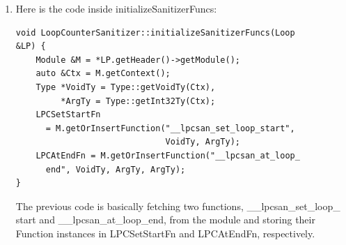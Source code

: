 \begin{enumerate}
\begin{lstlisting}[style=styleCXX]
void foo(int S, int E, int ST) {
	for (int i = S; i < E; i += ST) {
		…
	}
}
\end{lstlisting}

In the preceding code, the S, E, and ST variables represent the initial, final, and step values of a loop, respectively. The goal of the  LoopCounterSanitizer pass is to insert LPCSetStartFn and LPCAtEndFn in the following way:

\begin{lstlisting}[style=styleCXX]
void foo(int S, int E, int ST) {
	for (int i = S; i < E; i += ST) {
		lpc_set_start(S);
		…
		lpc_at_end(E, ST);
	}
}
\end{lstlisting}

lpc\_set\_start and lpc\_at\_end in the preceding code are Function instances that are stored in LPCSetStartFn and LPCAtEndFn, respectively. Here is one of the possible (pseudo) implementations of these two functions:

\begin{lstlisting}[style=styleCXX]
static int CurrentStartVal = 0;
void lpc_set_start(int start) {
	CurrentStartVal = start;
}
void lpc_at_end(int end, int step) {
	int trip_count = (end – CurrentStartVal) / step;
	printf("Found a loop with trip count %d\n",
	trip_count);
}
\end{lstlisting}

Now that we know the roles of LPCSetStartFn and LPCAtEndFn, it's time to take a look at how initializeSanitizerFuncs initializes them.

\item Here is the code inside initializeSanitizerFuncs:

\begin{lstlisting}[style=styleCXX]
void LoopCounterSanitizer::initializeSanitizerFuncs(Loop
&LP) {
	Module &M = *LP.getHeader()->getModule();
	auto &Ctx = M.getContext();
	Type *VoidTy = Type::getVoidTy(Ctx),
	     *ArgTy = Type::getInt32Ty(Ctx);
	LPCSetStartFn
	  = M.getOrInsertFunction("__lpcsan_set_loop_start",
	                          VoidTy, ArgTy);
	LPCAtEndFn = M.getOrInsertFunction("__lpcsan_at_loop_
	  end", VoidTy, ArgTy, ArgTy);
}
\end{lstlisting}

The previous code is basically fetching two functions, \_\_lpcsan\_set\_loop\_ start and \_\_lpcsan\_at\_loop\_end, from the module and storing their Function instances in LPCSetStartFn and LPCAtEndFn, respectively.


\end{enumerate}
